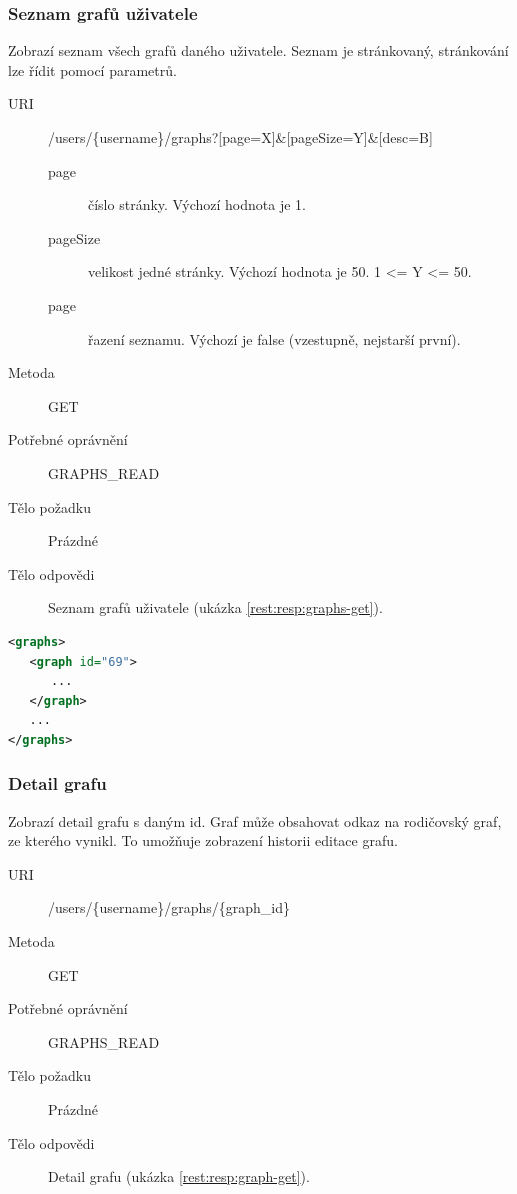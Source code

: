 \documentclass[thesis=M,czech]{FITthesis}[2014/05/6]
\begin{document}
\subsubsection{Seznam grafů uživatele}
Zobrazí seznam všech grafů daného uživatele. Seznam je stránkovaný, stránkování lze řídit pomocí parametrů.
\begin{description}
  \item[URI] /users/\{username\}/graphs?[page=X]\&[pageSize=Y]\&[desc=B]
  \begin{description}
     \item[page] číslo stránky. Výchozí hodnota je 1.
     \item[pageSize] velikost jedné stránky. Výchozí hodnota je 50. 1 <= Y <= 50.
     \item[page] řazení seznamu. Výchozí je false (vzestupně, nejstarší první).
  \end{description}	
  \item[Metoda] GET
  \item[Potřebné oprávnění] GRAPHS\_READ
  \item[Tělo požadku] Prázdné
  \item[Tělo odpovědi] Seznam grafů uživatele (ukázka \ref{rest:resp:graphs-get}).
\end{description}

\begin{lstlisting}[caption=Tělo odpovědi zdroje /users/\{username\}/graphs (GET), label=rest:resp:graphs-get, language=xml]
<graphs>
   <graph id="69">
      ...
   </graph>
   ...
</graphs>
\end{lstlisting}  

\subsubsection{Detail grafu}
Zobrazí detail grafu s daným id. Graf může obsahovat odkaz na rodičovský graf, ze kterého vynikl. To umožňuje zobrazení historii editace grafu.
\begin{description}
  \item[URI] /users/\{username\}/graphs/\{graph\_id\}
  \item[Metoda] GET
  \item[Potřebné oprávnění] GRAPHS\_READ
  \item[Tělo požadku] Prázdné
  \item[Tělo odpovědi] Detail grafu (ukázka \ref{rest:resp:graph-get}).
\end{description}
\end{document}
